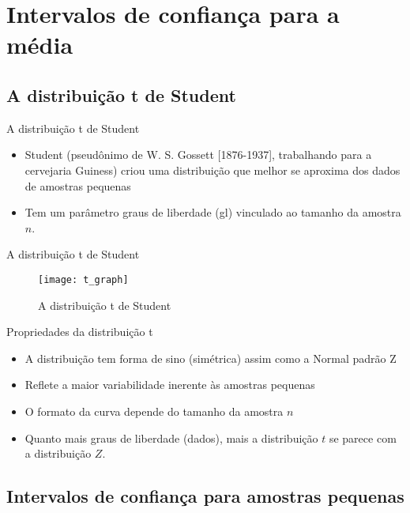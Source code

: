 \documentclass{beamer}
\begin{document}
\section{Intervalos de confiança para a média}

\subsection{A distribuição t de Student}

\begin{frame}{A distribuição t de Student}
  \begin{itemize}
  \item Student (pseudônimo de W. S. Gossett [1876-1937], trabalhando
    para a cervejaria Guiness) criou uma distribuição que melhor se
    aproxima dos dados de amostras pequenas
  \item Tem um parâmetro \alert{graus de liberdade} (gl) vinculado ao
    tamanho da amostra $n$.
  \end{itemize}
\end{frame}

\begin{frame}{A distribuição t de Student}
  \begin{figure}
    \texttt{[image: t\_graph]}
    \caption{A distribuição t de Student}
  \end{figure}
\end{frame}

\begin{frame}{Propriedades da distribuição t}
  \begin{itemize}
  \item A distribuição tem forma de sino (simétrica) assim como a
    Normal padrão Z
  \item Reflete a maior variabilidade inerente às amostras pequenas
  \item O formato da curva depende do tamanho da amostra $n$
  \item Quanto mais graus de liberdade (dados), mais a distribuição
    $t$ se parece com a distribuição $Z$.
  \end{itemize}
\end{frame}

\subsection{Intervalos de confiança para amostras pequenas}
\end{document}
